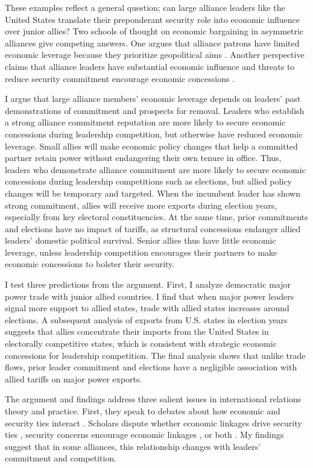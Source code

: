 \documentclass[12pt]{article}
\begin{document}
These examples reflect a general question; can large alliance leaders like the United States translate their preponderant security role into economic influence over junior allies? 
Two schools of thought on economic bargaining in asymmetric alliances give competing answers. 
One argues that alliance patrons have limited economic leverage because they prioritize geopolitical aims \citep{Drezner2013, WolfordKim2017}.
Another perspective claims that alliance leaders have substantial economic influence \citep{Norrlof2010, Brooksetal2013} and threats to reduce security commitment encourage economic concessions \citep[pg. 122]{Oatley2015}. 


I argue that large alliance members' economic leverage depends on leaders' past demonstrations of commitment and prospects for removal.
Leaders who establish a strong alliance commitment reputation are more likely to secure economic concessions during leadership competition, but otherwise have reduced economic leverage.
Small allies will make economic policy changes that help a committed partner retain power without endangering their own tenure in office.  
Thus, leaders who demonstrate alliance commitment are more likely to secure economic concessions during leadership competitions such as elections, but allied policy changes will be temporary and targeted.
When the incumbent leader has shown strong commitment, allies will receive more exports during election years, especially from key electoral constituencies. 
At the same time, prior commitments and elections have no impact of tariffs, as structural concessions endanger allied leaders' domestic political survival. 
Senior allies thus have little economic leverage, unless leadership competition encourages their partners to make economic concessions to bolster their security. 


I test three predictions from the argument.
First, I analyze democratic major power trade with junior allied countries. 
I find that when major power leaders signal more support to allied states, trade with allied states increases around elections. 
A subsequent analysis of exports from U.S. states in election years suggests that allies concentrate their imports from the United States in electorally competitive states, which is consistent with strategic economic concessions for leadership competition.
The final analysis shows that unlike trade flows, prior leader commitment and elections have a negligible association with allied tariffs on major power exports. 


The argument and findings address three salient issues in international relations theory and practice. 
First, they speak to debates about how economic and security ties interact \citep{Mastanduno2009, Poast2019}. 
Scholars dispute whether economic linkages drive security ties \citep{BiglaiserDeRouen2007, Fordham2010, Kimball2010}, security concerns encourage economic linkages \citep{Gowa1995, Li2003, LongLeeds2006, GowaMansfield2004}, or both \citep{BiglaiserDeRouen2009, KinneBunte2018}. 
My findings suggest that in some alliances, this relationship changes with leaders' commitment and competition.
\end{document}
